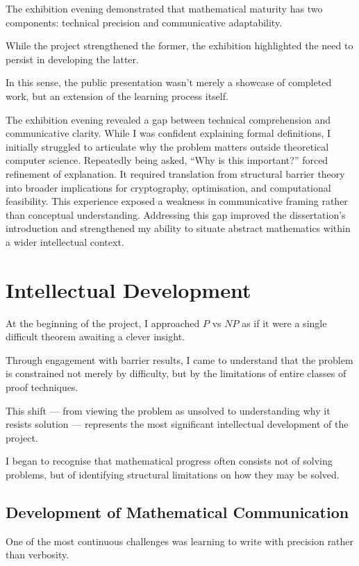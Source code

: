 \documentclass[12pt]{article}
\begin{document}
The exhibition evening demonstrated that mathematical maturity has two components: technical precision and communicative adaptability.

While the project strengthened the former, the exhibition highlighted the need to persist in developing the latter.

In this sense, the public presentation wasn't merely a showcase of completed work, but an extension of the learning process itself.

The exhibition evening revealed a gap between technical comprehension and communicative clarity.
While I was confident explaining formal definitions, I initially struggled to articulate why the problem matters outside theoretical computer science.
Repeatedly being asked, “Why is this important?” forced refinement of explanation.
It required translation from structural barrier theory into broader implications for cryptography, optimisation, and computational feasibility.
This experience exposed a weakness in communicative framing rather than conceptual understanding.
Addressing this gap improved the dissertation's introduction and strengthened my ability to situate abstract mathematics within a wider intellectual context.

\section{Intellectual Development}

At the beginning of the project, I approached $P$ vs $NP$ as if it were a single difficult theorem awaiting a clever insight.

Through engagement with barrier results, I came to understand that the problem is constrained not merely by difficulty, but by the limitations of entire classes of proof techniques.

This shift --- from viewing the problem as unsolved to understanding why it resists solution --- represents the most significant intellectual development of the project.

I began to recognise that mathematical progress often consists not of solving problems, but of identifying structural limitations on how they may be solved.

\subsection{Development of Mathematical Communication}

One of the most continuous challenges was learning to write with precision rather than verbosity.
\end{document}
